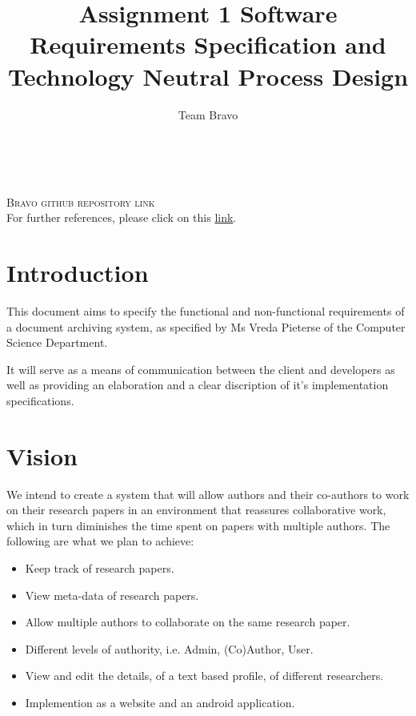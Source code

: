 \documentclass[11pt]{article}
\author{Team Bravo}
\title{Assignment 1 Software Requirements Specification and Technology Neutral Process Design}
\begin{document}
	\setlength{\parskip}{6pt}
	
	
	
	\renewcommand{\thesection}{\arabic{section}}
	\newpage
	
	\tableofcontents
	
	\textsc{}\\[1cm]
	
	\begin{center}
		\textsc{\Large Bravo github repository link}\\[0.5cm]
		For further references, please click on this \href{https://github.com/ish1993/Bravo}{link}.
	\end{center}
	
	\newpage
	
	\section{Introduction}
	
	This document aims to specify the functional and non-functional requirements of a document archiving system, as specified by Ms Vreda Pieterse of the Computer Science Department.
	
	It will serve as a means of communication between the client and developers as well as providing an elaboration and a clear discription of it's implementation specifications.
	
	\section{Vision}
	
	We intend to create a system that will allow authors and their co-authors to work on their research papers in an environment that reassures collaborative work, which in turn diminishes the time spent on papers with multiple authors. The following are what we plan to achieve:
	
	\begin{itemize}
		\item Keep track of research papers.
		\item View meta-data of research papers.
		\item Allow multiple authors to collaborate on the same research paper.
		\item Different levels of authority, i.e. Admin, (Co)Author, User.
		\item View and edit the details, of a text based profile, of different researchers.
		\item Implemention as a website and an android application.
	\end{itemize}
	
\end{document}
